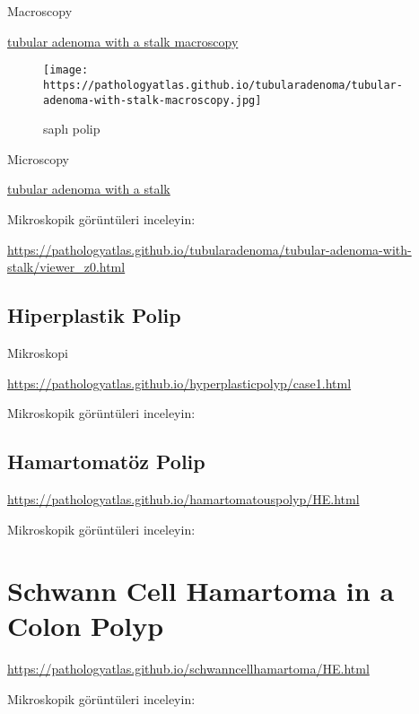 \documentclass[
  letterpaper,
  DIV=11,
  numbers=noendperiod]{scrreprt}
\begin{document}
Macroscopy

\href{https://pathologyatlas.github.io/tubularadenoma/tubular-adenoma-with-stalk-macroscopy.jpg}{tubular
adenoma with a stalk macroscopy}

\begin{figure}

{\centering \texttt{[image: https://pathologyatlas.github.io/tubularadenoma/tubular-adenoma-with-stalk-macroscopy.jpg]}

}

\caption{saplı polip}

\end{figure}

Microscopy

\href{https://pathologyatlas.github.io/tubularadenoma/tubular-adenoma-with-stalk.jpeg}{tubular
adenoma with a stalk}

Mikroskopik görüntüleri inceleyin:

\url{https://pathologyatlas.github.io/tubularadenoma/tubular-adenoma-with-stalk/viewer_z0.html}

\hypertarget{hiperplastik-polip}{%
\section{Hiperplastik Polip}\label{hiperplastik-polip}}

Mikroskopi

\url{https://pathologyatlas.github.io/hyperplasticpolyp/case1.html}

Mikroskopik görüntüleri inceleyin:

\hypertarget{hamartomatuxf6z-polip-1}{%
\section{Hamartomatöz Polip}\label{hamartomatuxf6z-polip-1}}

\url{https://pathologyatlas.github.io/hamartomatouspolyp/HE.html}

Mikroskopik görüntüleri inceleyin:

\hypertarget{schwann-cell-hamartoma-in-a-colon-polyp-1}{%
\chapter{Schwann Cell Hamartoma in a Colon
Polyp}\label{schwann-cell-hamartoma-in-a-colon-polyp-1}}

\url{https://pathologyatlas.github.io/schwanncellhamartoma/HE.html}

Mikroskopik görüntüleri inceleyin:
\end{document}
